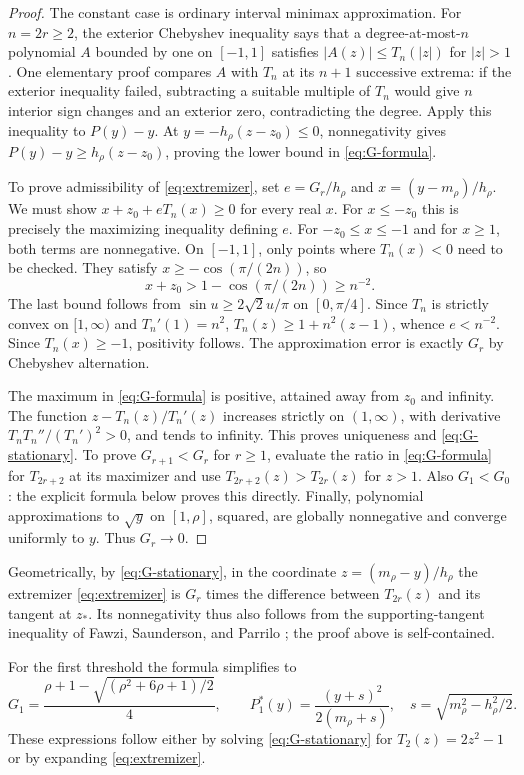 \begin{proof}
The constant case is ordinary interval minimax approximation. For $n=2r\geq2$, the exterior Chebyshev inequality says that a degree-at-most-$n$ polynomial $A$ bounded by one on $[-1,1]$ satisfies $|A(z)|\leq T_n(|z|)$ for $|z|>1$. One elementary proof compares $A$ with $T_n$ at its $n+1$ successive extrema: if the exterior inequality failed, subtracting a suitable multiple of $T_n$ would give $n$ interior sign changes and an exterior zero, contradicting the degree. Apply this inequality to $P(y)-y$. At $y=-h_\rho(z-z_0)\leq0$, nonnegativity gives $P(y)-y\geq h_\rho(z-z_0)$, proving the lower bound in \eqref{eq:G-formula}.

To prove admissibility of \eqref{eq:extremizer}, set $e=G_r/h_\rho$ and $x=(y-m_\rho)/h_\rho$. We must show $x+z_0+eT_n(x)\geq0$ for every real $x$. For $x\leq-z_0$ this is precisely the maximizing inequality defining $e$. For $-z_0\leq x\leq-1$ and for $x\geq1$, both terms are nonnegative. On $[-1,1]$, only points where $T_n(x)<0$ need to be checked. They satisfy $x\geq-\cos(\pi/(2n))$, so
\[
 x+z_0>1-\cos(\pi/(2n))\geq n^{-2}.
\]
The last bound follows from $\sin u\geq2\sqrt2 u/\pi$ on $[0,\pi/4]$. Since $T_n$ is strictly convex on $[1,\infty)$ and $T_n'(1)=n^2$,
$T_n(z)\geq1+n^2(z-1)$, whence $e<n^{-2}$. Since $T_n(x)\geq-1$, positivity follows. The approximation error is exactly $G_r$ by Chebyshev alternation.

The maximum in \eqref{eq:G-formula} is positive, attained away from $z_0$ and infinity. The function $z-T_n(z)/T_n'(z)$ increases strictly on $(1,\infty)$, with derivative $T_nT_n''/(T_n')^2>0$, and tends to infinity. This proves uniqueness and \eqref{eq:G-stationary}. To prove $G_{r+1}<G_r$ for $r\geq1$, evaluate the ratio in \eqref{eq:G-formula} for $T_{2r+2}$ at its maximizer and use $T_{2r+2}(z)>T_{2r}(z)$ for $z>1$. Also $G_1<G_0$: the explicit formula below proves this directly. Finally, polynomial approximations to $\sqrt y$ on $[1,\rho]$, squared, are globally nonnegative and converge uniformly to $y$. Thus $G_r\to0$.
\end{proof}
Geometrically, by \eqref{eq:G-stationary}, in the coordinate $z=(m_\rho-y)/h_\rho$ the extremizer \eqref{eq:extremizer} is $G_r$ times the difference between $T_{2r}(z)$ and its tangent at $z_*$. Its nonnegativity thus also follows from the supporting-tangent inequality of Fawzi, Saunderson, and Parrilo \cite[Appendix A, Lemma 1]{fawzi2017}; the proof above is self-contained.

For the first threshold the formula simplifies to
\begin{equation}\label{eq:G1}
 G_1=\frac{\rho+1-\sqrt{(\rho^2+6\rho+1)/2}}4,
 \qquad P_1^*(y)=\frac{(y+s)^2}{2(m_\rho+s)},\quad
 s=\sqrt{m_\rho^2-h_\rho^2/2}.
\end{equation}
These expressions follow either by solving \eqref{eq:G-stationary} for $T_2(z)=2z^2-1$ or by expanding \eqref{eq:extremizer}.

